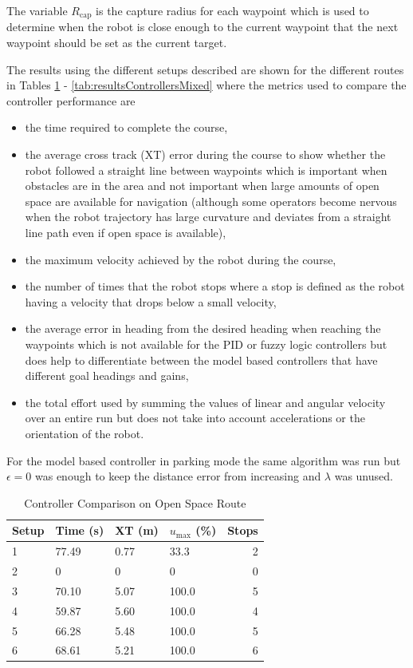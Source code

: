 The variable $R_{\text{cap}}$ is the capture radius for each waypoint which is used to determine when the robot is close enough to the current waypoint that the next waypoint should be set as the current target.

The results using the different setups described are shown for the different routes in Tables \ref{tab:resultsControllersOpenSpace} - \ref{tab:resultsControllersMixed} where the metrics used to compare the controller performance are
\begin{itemize}
\item the time required to complete the course,
\item the average cross track (XT) error during the course to show whether the robot followed a straight line between waypoints which is important when obstacles are in the area and not important when large amounts of open space are available for navigation (although some operators become nervous when the robot trajectory has large curvature and deviates from a straight line path even if open space is available),
\item the maximum velocity achieved by the robot during the course,
\item the number of times that the robot stops where a stop is defined as the robot having a velocity that drops below a small velocity,
\item the average error in heading from the desired heading when reaching the waypoints which is not available for the PID or fuzzy logic controllers but does help to differentiate between the model based controllers that have different goal headings and gains,
\item the total effort used by summing the values of linear and angular velocity over an entire run but does not take into account accelerations or the orientation of the robot.
\end{itemize}
For the model based controller in parking mode the same algorithm was run but $\epsilon=0$ was enough to keep the distance error from increasing and $\lambda$ was unused.

\begin{table}[ht!]
\caption{Controller Comparison on Open Space Route}
\small
\centering
\begin{tabular}{@{}llllr@{}} \toprule
Setup & Time (s) & XT (m) & $u_{\text{max}}$ (\%) & Stops \\ \midrule
1     & 77.49    & 0.77   & 33.3                  & 2     \\
2     & 0        & 0      & 0                     & 0     \\
3     & 70.10    & 5.07   & 100.0                 & 5     \\
4     & 59.87    & 5.60   & 100.0                 & 4     \\
5     & 66.28    & 5.48   & 100.0                 & 5     \\
6     & 68.61    & 5.21   & 100.0                 & 6     \\ \bottomrule
\end{tabular}
\label{tab:resultsControllersOpenSpace}
\end{table}

